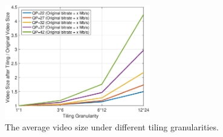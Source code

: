 %
%
%
%

\begin{figure}
  \centering
  \includegraphics[width=2.5in]{images/bitrateefficiency.eps}
  \caption{The average video size under different tiling granularities. }
  \label{fig:bitrate-efficiency}
  \end{figure}

